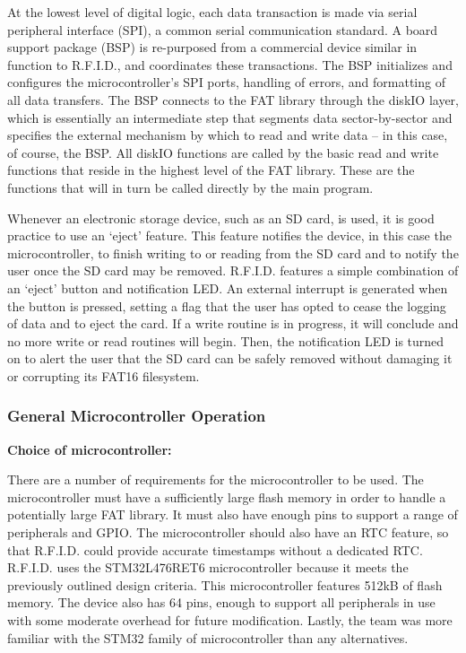 At the lowest level of digital logic, each data transaction is made via serial peripheral interface (SPI), a common serial communication standard. A board support package (BSP) is re-purposed from a commercial device similar in function to R.F.I.D., and coordinates these transactions. The BSP initializes and configures the microcontroller's SPI ports, handling of errors, and formatting of all data transfers. The BSP connects to the FAT library through the diskIO layer, which is essentially an intermediate step that segments data sector-by-sector and specifies the external mechanism by which to read and write data -- in this case, of course, the BSP. All diskIO functions are called by the basic read and write functions that reside in the highest level of the FAT library. These are the functions that will in turn be called directly by the main program.

Whenever an electronic storage device, such as an SD card, is used, it is good practice to use an `eject' feature. This feature notifies the device, in this case the microcontroller, to finish writing to or reading from the SD card and to notify the user once the SD card may be removed. R.F.I.D. features a simple combination of an `eject' button and notification LED. An external interrupt is generated when the button is pressed, setting a flag that the user has opted to cease the logging of data and to eject the card. If a write routine is in progress, it will conclude and no more write or read routines will begin. Then, the notification LED is turned on to alert the user that the SD card can be safely removed without damaging it or corrupting its FAT16 filesystem.

\subsubsection{General Microcontroller Operation}
\textbf{Choice of microcontroller:}

 There are a number of requirements for the microcontroller to be used.
 The microcontroller must have a sufficiently large flash memory in order to handle a potentially large FAT library. It must also have enough pins to support a range of peripherals and GPIO. The microcontroller should also have an RTC feature, so that R.F.I.D. could provide accurate timestamps without a dedicated RTC. 
 R.F.I.D. uses the STM32L476RET6 microcontroller because it meets the previously outlined design criteria. This microcontroller features 512kB of flash memory. The device also has 64 pins, enough to support all peripherals in use with some moderate overhead for future modification. Lastly, the team was more familiar with the STM32 family of microcontroller than any alternatives.

